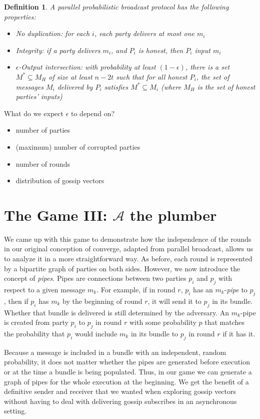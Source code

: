 \documentclass{article}
\newtheorem{definition}{Definition}
\begin{document}
\begin{definition}
A \emph{parallel probabilistic broadcast} protocol has the following properties:
\begin{itemize}
    \item No duplication: for each $i$, each party delivers at most one $m_i$
    \item Integrity: if a party delivers $m_i$, and $P_i$ is honest, then 
        $P_i$ input $m_i$
    \item $\epsilon$-Output intersection: with probability
    at least $(1-\epsilon)$, there is a set $M^*\subseteq M_H$ of size
    at least $n-2t$ such that for all honest $P_i$, 
    the set of messages $M_i$ delivered by $P_i$
    satisfies $M^*\subseteq M_i$ (where $M_H$ is the set of honest parties' inputs)
\end{itemize}
\end{definition}

What do we expect $\epsilon$ to depend on?
\begin{itemize}
    \item number of parties
    \item (maximum) number of corrupted parties
    \item number of rounds
    \item distribution of gossip vectors
\end{itemize}

\section{The Game III: $\mathcal{A}$ the plumber}
We came up with this game to demonstrate how the independence of the rounds in our original conception of converge, adapted from parallel broadcast, allows us to analyze it in a more straightforward way. As before, each round is represented by a bipartite graph of parties on both sides. However, we now introduce the concept of \emph{pipes}. Pipes are connections between two parties $p_i$ and $p_j$ with respect to a given message $m_k$. For example, if in round $r$, $p_i$ has an $m_k$-\emph{pipe} to $p_j$, then if $p_i$ has $m_k$ by the beginning of round $r$, it will send it to $p_j$ in its bundle. Whether that bundle is delivered is still determined by the adversary. An $m_k$-pipe is created from party $p_i$ to $p_j$ in round $r$ with some probability $p$ that matches the probability that $p_i$ would include $m_k$ in its bundle to $p_j$ in round $r$ if it has it. 

Because a message is included in a bundle with an independent, random probability, it does not matter whether the pipes are generated before execution or at the time a bundle is being populated. Thus, in our game we can generate a graph of pipes for the whole execution at the beginning. We get the benefit of a definitive sender and receiver that we wanted when exploring gossip vectors without having to deal with delivering gossip subscribes in an asynchronous setting.
\end{document}
